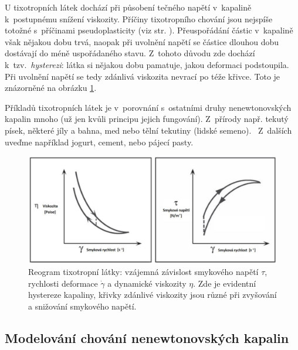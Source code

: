 \documentclass[12pt]{article}
\begin{document}
U tixotropních látek dochází při působení tečného napětí v~kapalině k~postupnému snížení viskozity. Příčiny tixotropního chování jsou nejspíše totožné s~příčinami pseudoplasticity (viz str. \pageref{sec:pseudoplasticita}). Přeuspořádání částic v~kapalině však nějakou dobu trvá, naopak při uvolnění napětí se částice dlouhou dobu dostávají do méně uspořádaného stavu. Z~tohoto důvodu zde dochází k~tzv.~\emph{hysterezi}: látka si nějakou dobu \glqq pamatuje\grqq, jakou deformaci podstoupila. Při uvolnění napětí se tedy zdánlivá viskozita nevrací po téže křivce. Toto je znázorněné na obrázku \ref{fig:tixotropni_kap}.~\cite{thesis:Viskozimetr_pro_viskozni_materialy}
\par
Příkladů tixotropních látek je v~porovnání s~ostatními druhy nenewtonovských kapalin mnoho (už jen kvůli principu jejich fungování). Z~přírody např. tekutý písek, některé jíly a bahna, med nebo tělní tekutiny (lidské semeno).~\cite{wiki:Thixotropy} Z~dalších uveďme například jogurt, cement, nebo pájecí pasty.~\cite{Article:Thixotropy}\cite{Article:cement}\cite{thesis:Viskozimetr_pro_viskozni_materialy}\cite{wiki:Time-dependent_viscosity}

\begin{figure}
    \centering
    \includegraphics[width=\linewidth]{figures/tixotropni_hystereze.png}
    \caption{Reogram tixotropní látky: vzájemná závislost smykového napětí $\tau$, rychlosti deformace $\dot\gamma$ a dynamické viskozity $\eta$. Zde je evidentní hystereze kapaliny, křivky zdánlivé viskozity jsou různé při zvyšování a snižování smykového napětí.~\cite{thesis:Viskozimetr_pro_viskozni_materialy}}
    \label{fig:tixotropni_kap}
\end{figure}

\subsection{Modelování chování nenewtonovských kapalin}%
\end{document}
